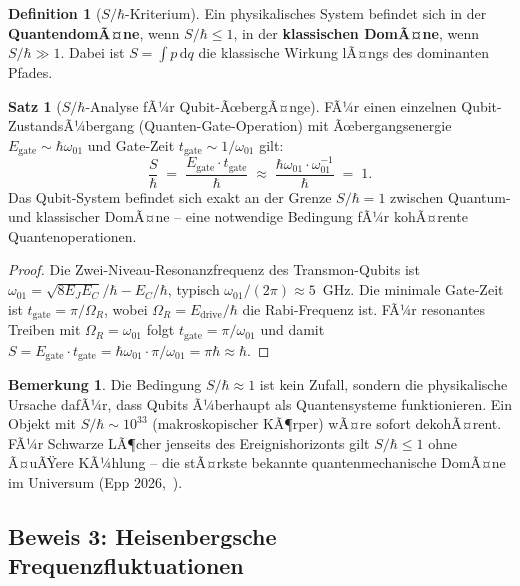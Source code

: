 ﻿\documentclass[a4paper,12pt]{article}
\theoremstyle{definition}
\newtheorem{definition}{Definition}
\newtheorem{satz}{Satz}
\newtheorem{bemerkung}{Bemerkung}
\begin{document}
\begin{definition}[$S/\hbar$-Kriterium]
Ein physikalisches System befindet sich in der \textbf{QuantendomÃ¤ne}, wenn
$S/\hbar \leq 1$, in der \textbf{klassischen DomÃ¤ne}, wenn $S/\hbar \gg 1$.
Dabei ist $S = \int p\,\mathrm{d}q$ die klassische Wirkung lÃ¤ngs des dominanten
Pfades.
\end{definition}

\begin{satz}[$S/\hbar$-Analyse fÃ¼r Qubit-ÃœbergÃ¤nge]
\label{satz:wirkung}
FÃ¼r einen einzelnen Qubit-ZustandsÃ¼bergang (Quanten-Gate-Operation) mit
Ãœbergangsenergie $E_\mathrm{gate} \sim \hbar\omega_{01}$ und Gate-Zeit
$t_\mathrm{gate} \sim 1/\omega_{01}$ gilt:
\[
  \frac{S}{\hbar} \;=\; \frac{E_\mathrm{gate}\cdot t_\mathrm{gate}}{\hbar}
  \;\approx\; \frac{\hbar\omega_{01} \cdot \omega_{01}^{-1}}{\hbar}
  \;=\; 1.
\]
Das Qubit-System befindet sich exakt an der Grenze $S/\hbar = 1$ zwischen
Quantum- und klassischer DomÃ¤ne -- eine notwendige Bedingung fÃ¼r kohÃ¤rente
Quantenoperationen.
\end{satz}

\begin{proof}
Die Zwei-Niveau-Resonanzfrequenz des Transmon-Qubits ist
$\omega_{01} = \sqrt{8 E_J E_C}/\hbar - E_C/\hbar$, typisch
$\omega_{01}/(2\pi) \approx 5$~GHz. Die minimale Gate-Zeit ist
$t_\mathrm{gate} = \pi/\Omega_R$, wobei $\Omega_R = E_\mathrm{drive}/\hbar$
die Rabi-Frequenz ist. FÃ¼r resonantes Treiben mit $\Omega_R = \omega_{01}$ folgt
$t_\mathrm{gate} = \pi/\omega_{01}$ und damit
$S = E_\mathrm{gate}\cdot t_\mathrm{gate} =
\hbar\omega_{01}\cdot\pi/\omega_{01} = \pi\hbar \approx \hbar$.
\end{proof}

\begin{bemerkung}
Die Bedingung $S/\hbar \approx 1$ ist kein Zufall, sondern die physikalische
Ursache dafÃ¼r, dass Qubits Ã¼berhaupt als Quantensysteme funktionieren. Ein Objekt
mit $S/\hbar \sim 10^{33}$ (makroskopischer KÃ¶rper) wÃ¤re sofort dekohÃ¤rent.
FÃ¼r Schwarze LÃ¶cher jenseits des Ereignishorizonts gilt $S/\hbar \leq 1$ ohne
Ã¤uÃŸere KÃ¼hlung -- die stÃ¤rkste bekannte quantenmechanische DomÃ¤ne im Universum
(Epp 2026,~\cite{epp2026cnyn}).
\end{bemerkung}

\subsection{Beweis 3: Heisenbergsche Frequenzfluktuationen}
\label{sec:heisenberg}
\end{document}

